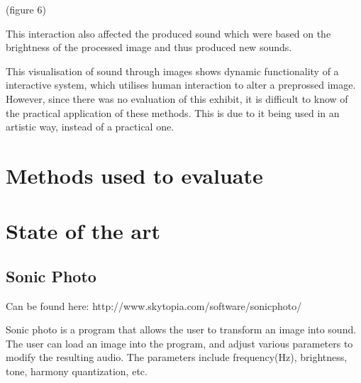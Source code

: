 (figure 6) 

This interaction also affected the produced sound which were based on the brightness of the processed image and thus produced new sounds. 

This visualisation of sound through images shows dynamic functionality of a interactive system, which utilises human interaction to alter a preprossed image. However, since there was no evaluation of this exhibit, it is difficult to know of the practical application of these methods. This is due to it being used in an artistic way, instead of a practical one.   
 

\section{Methods used to evaluate}\label{sub:methodsusedtoevaluate}






\section{State of the art}\label{sec:stateart}

\subsection{Sonic Photo}\label{sub:sonic}
Can be found here: http://www.skytopia.com/software/sonicphoto/

Sonic photo is a program that allows the user to transform an image into sound. The user can load an image into the program, and adjust various parameters to modify the resulting audio. The parameters include  frequency(Hz), brightness, tone, harmony quantization, etc.

